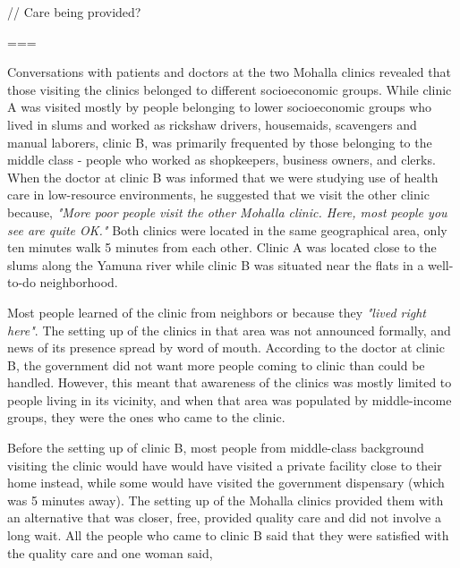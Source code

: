 //
Care being provided?

===



Conversations with patients and doctors at the two Mohalla clinics revealed that those visiting the clinics belonged to different socioeconomic groups. While clinic A was visited mostly by people belonging to lower socioeconomic groups who lived in slums and worked as rickshaw drivers, housemaids, scavengers and manual laborers, clinic B, was primarily frequented by those belonging to the middle class - people who worked as shopkeepers, business owners, and clerks. When the doctor at clinic B was informed that we were studying use of health care in low-resource environments, he suggested that we visit the other clinic because,
\textit{"More poor people visit the other Mohalla clinic. Here, most people 
you see are quite OK."}    
% 
%
Both clinics were located in the same geographical area, only ten minutes walk 5 minutes from each other. Clinic A was located close to the slums along the Yamuna river while clinic B was situated near the flats in a well-to-do neighborhood. %

Most people learned of the clinic from neighbors or because they  \textit{"lived right here"}. The setting up of the clinics in that area was not announced formally, and news of its presence spread by word of mouth. According to the doctor at clinic B, the government did not want more people coming to clinic than could be handled. However, this meant that awareness of the clinics was mostly limited to people living in its vicinity, and when that area was populated by middle-income groups, they were the ones who came to the clinic.

Before the setting up of clinic B, most people from middle-class background visiting the clinic would have would have visited a private facility close to their home instead, while some would have visited the government dispensary (which was 5 minutes away). The setting up of the Mohalla clinics provided them with an alternative that was closer, free, provided quality care and did not involve a long wait. All the people who came to clinic B said that they were satisfied with the quality care and one woman said,

